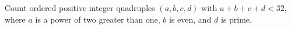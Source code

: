 Count ordered positive integer quadruples $(a,b,c,d)$ with $a+b+c+d<32$, where $a$ is a power of two greater than one, $b$ is even, and $d$ is prime.

